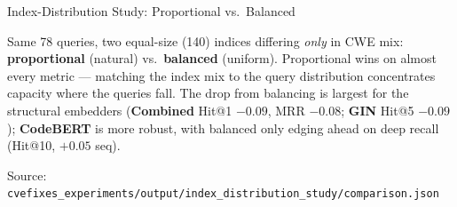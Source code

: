 \documentclass[aspectratio=169,10pt]{beamer}
\begin{document}
\begin{frame}{Index-Distribution Study: Proportional vs.\ Balanced}
  \vspace{0.3em}
  \begin{tcolorbox}[colback=c1!4, colframe=c1!60!black, boxrule=0.35pt,
    left=3pt, right=3pt, top=2pt, bottom=1pt, arc=2pt, width=\linewidth]
    \scriptsize
    Same 78 queries, two equal-size (140) indices differing \emph{only} in CWE mix: \textbf{proportional} (natural) vs.\ \textbf{balanced} (uniform). Proportional wins on almost every metric --- matching the index mix to the query distribution concentrates capacity where the queries fall. The drop from balancing is largest for the structural embedders (\textbf{Combined} Hit@1 \textcolor{miss}{$-0.09$}, MRR \textcolor{miss}{$-0.08$}; \textbf{GIN} Hit@5 \textcolor{miss}{$-0.09$}); \textbf{CodeBERT} is more robust, with balanced only edging ahead on deep recall (Hit@10, \textcolor{hit}{$+0.05$} seq).
  \end{tcolorbox}

  \vspace{0.2em}
  {\scriptsize\textcolor{notecol}{Source: \texttt{cvefixes\_experiments/output/index\_distribution\_study/comparison.json}}}

\end{frame}
\end{document}
